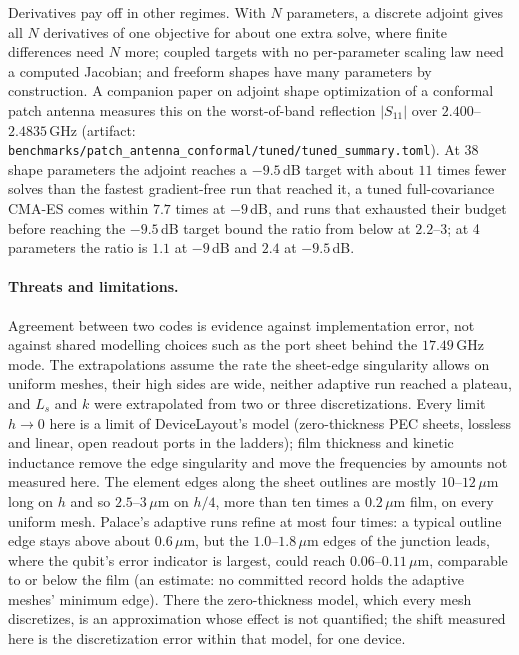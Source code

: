 \documentclass{anvil-paper}
\begin{document}
Derivatives pay off in other regimes. With $N$ parameters, a discrete
adjoint gives all $N$ derivatives of one objective for about one extra
solve, where finite differences need $N$ more; coupled targets with no
per-parameter scaling law need a computed Jacobian; and freeform shapes
have many parameters by construction. A companion paper on adjoint shape
optimization of a conformal patch antenna \citep{walters2026conformal}
measures this on the worst-of-band reflection $|S_{11}|$ over
$2.400$--$2.4835$\,GHz (artifact:
\texttt{benchmarks/patch\_antenna\_conformal/tuned/tuned\_summary.toml}).
At 38 shape parameters the adjoint reaches a $-9.5$\,dB target with about
$11$ times fewer solves than the fastest gradient-free run that reached it,
a tuned full-covariance CMA-ES comes within $7.7$ times at $-9$\,dB, and
runs that exhausted their budget before reaching the $-9.5$\,dB target
bound the ratio from below at $2.2$--$3$; at 4 parameters the ratio is $1.1$ at
$-9$\,dB and $2.4$ at $-9.5$\,dB.

\paragraph{Threats and limitations.}
Agreement between two codes is evidence against implementation error, not
against shared modelling choices such as the port sheet behind the
$17.49$\,GHz mode. The extrapolations assume the rate the sheet-edge
singularity allows on uniform meshes, their high sides are wide, neither
adaptive run reached a plateau, and $L_s$ and $k$ were extrapolated from
two or three discretizations. Every limit $h \to 0$ here is a limit of
DeviceLayout's model (zero-thickness PEC sheets, lossless and linear, open
readout ports in the ladders); film thickness and kinetic inductance remove
the edge singularity and move the frequencies by amounts not measured
here. The element edges
along the sheet outlines are mostly $10$--$12\,\mu$m long on $h$ and so
$2.5$--$3\,\mu$m on $h/4$, more than ten times a $0.2\,\mu$m film, on
every uniform mesh. Palace's adaptive runs refine at most four times: a
typical outline edge stays above about $0.6\,\mu$m, but the
$1.0$--$1.8\,\mu$m edges of the junction leads, where the qubit's error
indicator is largest, could reach $0.06$--$0.11\,\mu$m, comparable to or
below the film (an estimate: no committed record holds the adaptive
meshes' minimum edge). There the zero-thickness model, which every mesh
discretizes, is an approximation whose effect is not quantified; the shift
measured here is the discretization error within that model, for one
device.
\end{document}
